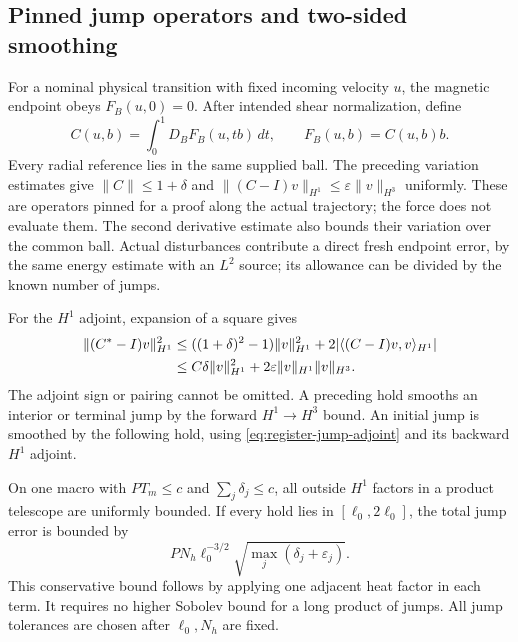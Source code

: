 \documentclass[11pt,a4paper]{amsart}
\theoremstyle{definition}
\theoremstyle{remark}
\numberwithin{equation}{section}
\newcommand{\ip}[2]{\langle #1,#2\rangle}
\newcommand{\norm}[1]{\lVert #1\rVert}
\begin{document}
\subsection{Pinned jump operators and two-sided smoothing}
For a nominal physical transition with fixed incoming velocity $u$, the
magnetic endpoint obeys $F_B(u,0)=0$.  After intended shear normalization,
define
\begin{equation}\label{eq:register-radial-jump}
 C(u,b)=\int_0^1D_BF_B(u,tb)\,dt,
 \qquad F_B(u,b)=C(u,b)b.
\end{equation}
Every radial reference lies in the same supplied ball.  The preceding
variation estimates give $\norm C\le1+\delta$ and
$\norm{(C-I)v}_{H^1}\le\varepsilon\norm v_{H^3}$ uniformly.
These are operators pinned for a proof along the actual trajectory; the
force does not evaluate them.  The second derivative estimate also bounds
their variation over the common ball.  Actual disturbances contribute a
direct fresh endpoint error, by the same energy estimate with an $L^2$
source; its allowance can be divided by the known number of jumps.

For the $H^1$ adjoint, expansion of a square gives
\begin{align}\label{eq:register-jump-adjoint}
 \norm{(C^*-I)v}_{H^1}^2
 &\le((1+\delta)^2-1)\norm v_{H^1}^2
            +2|\ip{(C-I)v}{v}_{H^1}|\notag\\
 &\le C\delta\norm v_{H^1}^2
               +2\varepsilon\norm v_{H^1}\norm v_{H^3}.
\end{align}
The adjoint sign or pairing cannot be omitted.  A preceding hold smooths
an interior or terminal jump by the forward $H^1\to H^3$ bound.  An
initial jump is smoothed by the following hold, using
\eqref{eq:register-jump-adjoint} and its backward $H^1$ adjoint.

On one macro with $PT_m\le c$ and $\sum_j\delta_j\le c$, all outside
$H^1$ factors in a product telescope are uniformly bounded.  If every
hold lies in $[\ell_0,2\ell_0]$, the total jump error is bounded by
\begin{equation}\label{eq:register-total-jumps}
 PN_h\ell_0^{-3/2}\sqrt{\max_j(\delta_j+\varepsilon_j)}.
\end{equation}
This conservative bound follows by applying one adjacent heat factor in
each term.  It requires no higher Sobolev bound for a long product of
jumps.  All jump tolerances are chosen after $\ell_0,N_h$ are fixed.
\end{document}
